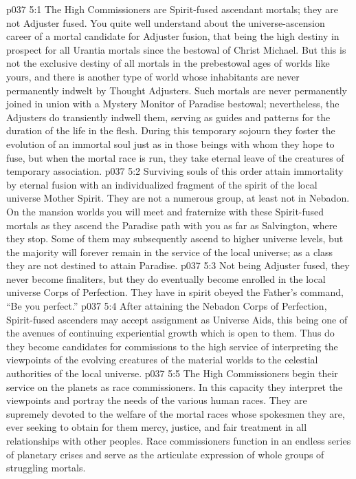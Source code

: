 \vs p037 5:1 The High Commissioners are Spirit\hyp{}fused ascendant mortals; they are not Adjuster fused. You quite well understand about the universe\hyp{}ascension career of a mortal candidate for Adjuster fusion, that being the high destiny in prospect for all Urantia mortals since the bestowal of Christ Michael. But this is not the exclusive destiny of all mortals in the prebestowal ages of worlds like yours, and there is another type of world whose inhabitants are never permanently indwelt by Thought Adjusters. Such mortals are never permanently joined in union with a Mystery Monitor of Paradise bestowal; nevertheless, the Adjusters do transiently indwell them, serving as guides and patterns for the duration of the life in the flesh. During this temporary sojourn they foster the evolution of an immortal soul just as in those beings with whom they hope to fuse, but when the mortal race is run, they take eternal leave of the creatures of temporary association.
\vs p037 5:2 Surviving souls of this order attain immortality by eternal fusion with an individualized fragment of the spirit of the local universe Mother Spirit. They are not a numerous group, at least not in Nebadon. On the mansion worlds you will meet and fraternize with these Spirit\hyp{}fused mortals as they ascend the Paradise path with you as far as Salvington, where they stop. Some of them may subsequently ascend to higher universe levels, but the majority will forever remain in the service of the local universe; as a class they are not destined to attain Paradise.\plusone
\vs p037 5:3 Not being Adjuster fused, they never become finaliters, but they do eventually become enrolled in the local universe Corps of Perfection. They have in spirit obeyed the Father’s command, “Be you perfect.”
\pc \vs p037 5:4 After attaining the Nebadon Corps of Perfection, Spirit\hyp{}fused ascenders may accept assignment as Universe Aids, this being one of the avenues of continuing experiential growth which is open to them. Thus do they become candidates for commissions to the high service of interpreting the viewpoints of the evolving creatures of the material worlds to the celestial authorities of the local universe.
\vs p037 5:5 The High Commissioners begin their service on the planets as race commissioners. In this capacity they interpret the viewpoints and portray the needs of the various human races. They are supremely devoted to the welfare of the mortal races whose spokesmen they are, ever seeking to obtain for them mercy, justice, and fair treatment in all relationships with other peoples. Race commissioners function in an endless series of planetary crises and serve as the articulate expression of whole groups of struggling mortals.

